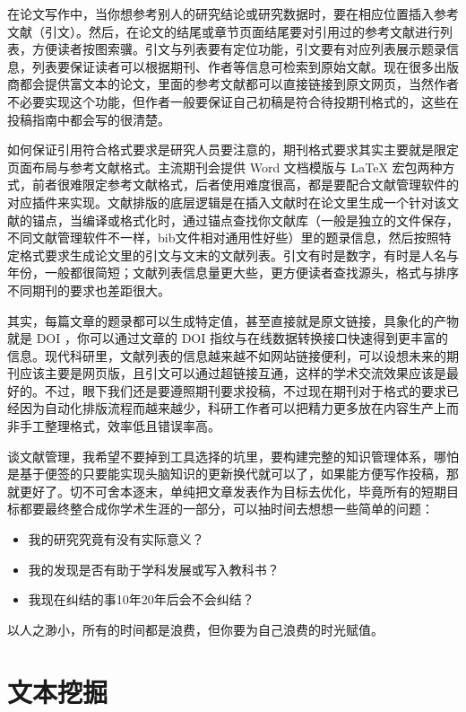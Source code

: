 \documentclass[]{tufte-book}
\providecommand{\tightlist}{%
  \setlength{\itemsep}{0pt}\setlength{\parskip}{0pt}}
\begin{document}
在论文写作中，当你想参考别人的研究结论或研究数据时，要在相应位置插入参考文献（引文）。然后，在论文的结尾或章节页面结尾要对引用过的参考文献进行列表，方便读者按图索骥。引文与列表要有定位功能，引文要有对应列表展示题录信息，列表要保证读者可以根据期刊、作者等信息可检索到原始文献。现在很多出版商都会提供富文本的论文，里面的参考文献都可以直接链接到原文网页，当然作者不必要实现这个功能，但作者一般要保证自己初稿是符合待投期刊格式的，这些在投稿指南中都会写的很清楚。

如何保证引用符合格式要求是研究人员要注意的，期刊格式要求其实主要就是限定页面布局与参考文献格式。主流期刊会提供 Word 文档模版与 LaTeX 宏包两种方式，前者很难限定参考文献格式，后者使用难度很高，都是要配合文献管理软件的对应插件来实现。文献排版的底层逻辑是在插入文献时在论文里生成一个针对该文献的锚点，当编译或格式化时，通过锚点查找你文献库（一般是独立的文件保存，不同文献管理软件不一样，bib文件相对通用性好些）里的题录信息，然后按照特定格式要求生成论文里的引文与文末的文献列表。引文有时是数字，有时是人名与年份，一般都很简短；文献列表信息量更大些，更方便读者查找源头，格式与排序不同期刊的要求也差距很大。

其实，每篇文章的题录都可以生成特定值，甚至直接就是原文链接，具象化的产物就是 DOI ，你可以通过文章的 DOI 指纹与在线数据转换接口快速得到更丰富的信息。现代科研里，文献列表的信息越来越不如网站链接便利，可以设想未来的期刊应该主要是网页版，且引文可以通过超链接互通，这样的学术交流效果应该是最好的。不过，眼下我们还是要遵照期刊要求投稿，不过现在期刊对于格式的要求已经因为自动化排版流程而越来越少，科研工作者可以把精力更多放在内容生产上而非手工整理格式，效率低且错误率高。

谈文献管理，我希望不要掉到工具选择的坑里，要构建完整的知识管理体系，哪怕是基于便签的只要能实现头脑知识的更新换代就可以了，如果能方便写作投稿，那就更好了。切不可舍本逐末，单纯把文章发表作为目标去优化，毕竟所有的短期目标都要最终整合成你学术生涯的一部分，可以抽时间去想想一些简单的问题：

\begin{itemize}
\tightlist
\item
  我的研究究竟有没有实际意义？
\item
  我的发现是否有助于学科发展或写入教科书？
\item
  我现在纠结的事10年20年后会不会纠结？
\end{itemize}

以人之渺小，所有的时间都是浪费，但你要为自己浪费的时光赋值。

\hypertarget{ux6587ux672cux6316ux6398}{%
\section{文本挖掘}\label{ux6587ux672cux6316ux6398}}
\end{document}
